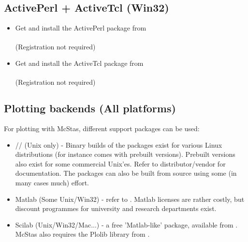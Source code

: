 \documentclass[a4paper,12pt]{article}
\begin{document}
\subsection{ActivePerl + ActiveTcl (Win32)}
\label{perltkwin}
\begin{itemize}
\item{Get and install the ActivePerl package from\\
    \\(Registration
    not required)}
\item{Get and install the ActiveTcl package from\\
    \\(Registration
    not required)}
\end{itemize}
\subsection{Plotting backends (All platforms)}
For plotting with McStas, different support packages can be used:
\begin{itemize}
\item{// (Unix only) - Binary builds of the packages
    exist for various Linux distributions (for instance
     comes with
    prebuilt versions). Prebuilt versions also exist for some commercial Unix'es. 
    Refer to distributor/vendor for documentation. The packages can also be
    built from source using some (in many cases much) effort.}
\item{Matlab (Some Unix/Win32) - refer to
    . Matlab licenses are rather costly, but discount programmes for university and research departments exist.}
\item{Scilab (Unix/Win32/Mac...) - a free 'Matlab-like' package, available from
    . McStas also requires the Plolib library from .}
\end{itemize}
\label{plotting}
\end{document}
